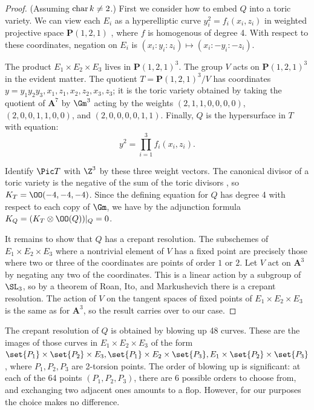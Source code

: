 \documentclass{article}
\DeclareMathOperator{\car}{{\rm char}}
\def\A{\mathbf{A}}
\def\P{\mathbf{P}}
\begin{document}
\begin{proof}  (Assuming $\car k\neq 2$.)  First we consider how to embed $Q$ into a toric 
variety.  We can view each $E_i$ as a hyperelliptic curve $y_i^2=f_i(x_i,z_i)$ in weighted projective space $\P(1,2,1)$ , where $f$ is homogenous of degree 4.  With respect to these coordinates, negation on $E_i$ is $(x_i:y_i:z_i)\mapsto (x_i:-y_i:-z_i)$.  

The product $E_1\times E_2\times E_3$ lives in $\P(1,2,1)^3$.  The group $V$ acts on $\P(1,2,1)^3$ in the evident matter.   The quotient $T=\P(1,2,1)^3/V$ has coordinates $y=y_1y_2y_3,x_1,z_1,x_2,z_2,x_3,z_3$;  it is the toric variety obtained by taking the quotient of $\mathbf{A}^7$ by $\Gm^3$ acting by the weights $(2,1,1,0,0,0,0)$, $(2,0,0,1,1,0,0)$, and $(2,0,0,0,0,1,1)$.  Finally, $Q$ is the hypersurface in $T$ with equation:
\[ y^2 = \prod_{i=1}^3 f_i(x_i,z_i).\]

Identify $\Pic T$ with $\Z^3$ by these three weight vectors.  
The canonical divisor of a toric variety is the negative of the sum of the toric divisors \cite[Proposition, section 4.3]{Fulton},
so $K_T=\OO(-4,-4,-4)$.  Since the defining equation for $Q$ has degree 4 with respect to each copy of $\Gm$, we have by the adjunction formula $K_Q = (K_T \otimes \OO(Q))\vert_Q = 0$.

It remains to show that $Q$ has a crepant resolution.  The subschemes of $E_1 \times E_2 \times E_3$ where a nontrivial element of $V$ has a fixed point are precisely those where two or three of the
  coordinates are points of order $1$ or $2$.
  Let $V$ act on $\A^3$ by negating any two of the coordinates.  This
  is a linear action by a subgroup of $\SL_3$, so by a theorem of Roan,
  Ito, and Markushevich \cite[Theorem 1]{Roan} there is a crepant resolution.
  The action of $V$ on the tangent spaces of fixed points of
  $E_1 \times E_2 \times E_3$ is the same as for $\A^3$, so the result
  carries over to our case.
\end{proof}

\begin{rmk} The crepant resolution of $Q$ is obtained by blowing up 48 curves.  These are the images of those curves in $E_1\times E_2\times E_3$ of the form $\set{P_1}\times \set{P_2}\times E_3,\set{P_1}\times E_2\times\set{P_3},E_1\times\set{P_2}\times\set{P_3}$, where $P_1,P_2,P_3$ are 2-torsion points.  The order of blowing up is significant: at each of the 64 points $(P_1,P_2,P_3)$, there are 6 possible orders to choose from, and exchanging two adjacent ones amounts to a flop.  However, for our purposes the choice makes no difference.
\end{rmk}
\end{document}
